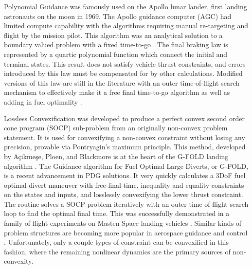 \documentclass[conf]{new-aiaa}
\begin{document}
Polynomial Guidance was famously used on the Apollo lunar lander, first landing astronauts on the moon in 1969. The Apollo guidance computer (AGC) had limited compute capability with the algorithms requiring manual re-targeting and flight by the mission pilot. This algorithm was an analytical solution to a boundary valued problem with a fixed time-to-go \cite{klumpp1974apollo}. The final braking law is represented by a quartic polynomial function which connect the initial and terminal states. This result does not satisfy vehicle thrust constraints, and errors introduced by this law must be compensated for by other calculations. Modified versions of this law are still in the literature with an outer time-of-flight search mechanism to effectively make it a free final time-to-go algorithm as well as adding in fuel optimality \cite{d1997optimal}.

Lossless Convexification was developed to produce a perfect convex second order cone program (SOCP) sub-problem from an originally non-convex problem statement. It is used for convexifying a non-convex constraint without losing any precision, provable via Pontryagin's maximum principle. This method, developed by Açikmeşe, Ploen, and Blackmore is at the heart of the G-FOLD landing algorithm \cite{blackmore2010minimum} \cite{accikmecse2011lossless} \cite{acikmese2012g}. The Guidance algorithm for Fuel Optimal Large Diverts, or G-FOLD, is a recent advancement in PDG solutions. It very quickly calculates a 3DoF fuel optimal divert maneuver with free-final-time, inequality and equality constraints on the states and inputs, and losslessly convexifying the lower thrust constraint. The routine solves a SOCP problem iteratively with an outer time of flight search loop to find the optimal final time. This was successfully demonstrated in a family of flight experiments on Masten Space landing vehicles \cite{acikmese2013flight} \cite{scharf2014adapt}. Similar kinds of problem structures are becoming more popular in aerospace guidance and control \cite{LiuSurvey2017} \cite{wang_paper}. Unfortunately, only a couple types of constraint can be convexified in this fashion, where the remaining nonlinear dynamics are the primary sources of non-convexity.
\end{document}
